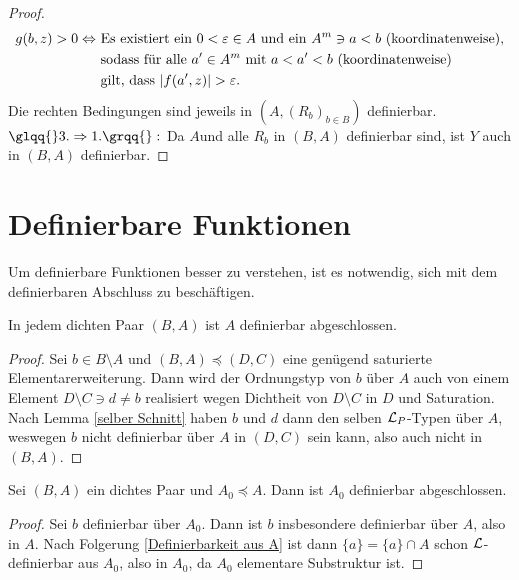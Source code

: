 \begin{proof}
\begin{align*}
	g(b,z)>0\Leftrightarrow\ &\text{Es existiert ein }0<\varepsilon\in A\text{ und ein }A^m\ni a<b\text{ (koordinatenweise),}\\&\text{sodass für alle }a'\in A^m\text{ mit }a<a'<b\text{ (koordinatenweise)}\\&\text{gilt, dass }{\left| f(a',z) \right|}>\varepsilon.
	\end{align*}
	Die rechten Bedingungen sind jeweils in $(A,(R_b)_{b\in B})$ definierbar.\\
	$\glqq{}3.\Rightarrow 1.\grqq{}:$ Da $A$und alle $R_b$ in $(B,A)$ definierbar sind, ist $Y$ auch in $(B,A)$ definierbar.
\end{proof}

\section{Definierbare Funktionen}
Um definierbare Funktionen besser zu verstehen, ist es notwendig, sich mit dem definierbaren Abschluss zu beschäftigen.

\begin{lemma}\label{A definierbar abgeschl}
	In jedem dichten Paar $(B,A)$ ist $A$ definierbar abgeschlossen.
\end{lemma}
\begin{proof}
	Sei $b\in B\setminus A$ und $(B,A)\preceq(D,C)$ eine genügend saturierte Elementarerweiterung. Dann wird der Ordnungstyp von $b$ über $A$ auch von einem Element $D\setminus C\ni d\neq b$ realisiert wegen Dichtheit von $D\setminus C$ in $D$ und Saturation.\newpage
	Nach Lemma \ref{selber Schnitt} haben $b$ und $d$ dann den selben $\mathcal{L}_P$-Typen über $A$, weswegen $b$ nicht definierbar über $A$ in $(D,C)$ sein kann, also auch nicht in $(B,A)$.
\end{proof}

\begin{corollary}
	Sei $(B,A)$ ein dichtes Paar und $A_0\preceq A$. Dann ist $A_0$ definierbar abgeschlossen.
\end{corollary}
\begin{proof}
	Sei $b$ definierbar über $A_0$. Dann ist $b$ insbesondere definierbar über $A$, also in $A$. Nach Folgerung \ref{Definierbarkeit aus A} ist dann $\{a\}=\{a\}\cap A$ schon $\mathcal{L}$-definierbar aus $A_0$, also in $A_0$, da $A_0$ elementare Substruktur ist.
\end{proof}

